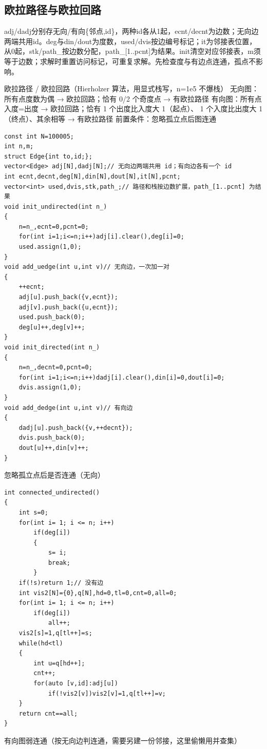 \documentclass[UTF8,fontset=fandol,a4paper,twoside]{ctexart}
\newcommand{\note}[1]{{\fontsize{10}{12}\selectfont #1\par}}
\begin{document}
\begin{multicols}{2}
\subsection{欧拉路径与欧拉回路}

\note{adj/\allowbreak{}dadj分别存无向/\allowbreak{}有向\{邻点,\allowbreak{}id\}，两种id各从1起，ecnt/\allowbreak{}decnt为边数；无向边两端共用id。deg与din/\allowbreak{}dout为度数，used/\allowbreak{}dvis按边编号标记；it为邻接表位置，从0起，stk/\allowbreak{}path\_按边数分配，path\_[\allowbreak{}1.\allowbreak{}.\allowbreak{}pcnt]\allowbreak{}为结果。init清空对应邻接表，m须等于边数；求解时重置访问标记，可重复求解。先检查度与有边点连通，孤点不影响。}
\note{欧拉路径 /\allowbreak{} 欧拉回路（Hierholzer 算法，用显式栈写，n=\allowbreak{}1e5 不爆栈） 无向图：所有点度数为偶 → 欧拉回路；恰有 0/\allowbreak{}2 个奇度点 → 有欧拉路径 有向图：所有点入度=\allowbreak{}出度 → 欧拉回路；恰有 1 个出度比入度大 1（起点）、 1 个入度比出度大 1（终点）、其余相等 → 有欧拉路径 前置条件：忽略孤立点后图连通}
\begin{lstlisting}
const int N=100005;
int n,m;
struct Edge{int to,id;};
vector<Edge> adj[N],dadj[N];// 无向边两端共用 id；有向边各有一个 id
int ecnt,decnt,deg[N],din[N],dout[N],it[N],pcnt;
vector<int> used,dvis,stk,path_;// 路径和栈按边数扩展，path_[1..pcnt] 为结果
void init_undirected(int n_)
{
    n=n_,ecnt=0,pcnt=0;
    for(int i=1;i<=n;i++)adj[i].clear(),deg[i]=0;
    used.assign(1,0);
}
void add_uedge(int u,int v)// 无向边，一次加一对
{
    ++ecnt;
    adj[u].push_back({v,ecnt});
    adj[v].push_back({u,ecnt});
    used.push_back(0);
    deg[u]++,deg[v]++;
}
void init_directed(int n_)
{
    n=n_,decnt=0,pcnt=0;
    for(int i=1;i<=n;i++)dadj[i].clear(),din[i]=0,dout[i]=0;
    dvis.assign(1,0);
}
void add_dedge(int u,int v)// 有向边
{
    dadj[u].push_back({v,++decnt});
    dvis.push_back(0);
    dout[u]++,din[v]++;
}
\end{lstlisting}
\note{忽略孤立点后是否连通（无向）}
\begin{lstlisting}
int connected_undirected()
{
    int s=0;
    for(int i= 1; i <= n; i++)
        if(deg[i])
        {
            s= i;
            break;
        }
    if(!s)return 1;// 没有边
    int vis2[N]={0},q[N],hd=0,tl=0,cnt=0,all=0;
    for(int i= 1; i <= n; i++)
        if(deg[i])
            all++;
    vis2[s]=1,q[tl++]=s;
    while(hd<tl)
    {
        int u=q[hd++];
        cnt++;
        for(auto [v,id]:adj[u])
            if(!vis2[v])vis2[v]=1,q[tl++]=v;
    }
    return cnt==all;
}
\end{lstlisting}
\note{有向图弱连通（按无向边判连通，需要另建一份邻接，这里偷懒用并查集）}

\end{multicols}
\end{document}
